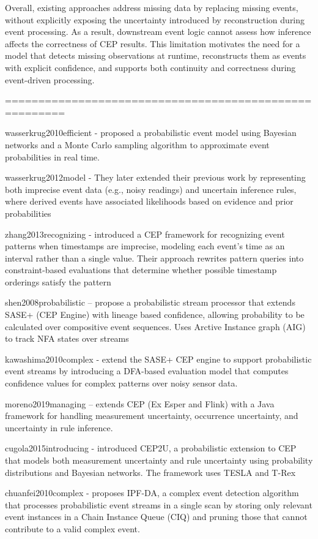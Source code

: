 Overall, existing approaches address missing data by replacing missing events, without explicitly exposing the uncertainty introduced by reconstruction during event processing. As a result, downstream event logic cannot assess how inference affects the correctness of CEP results. This limitation motivates the need for a model that detects missing observations at runtime, reconstructs them as events with explicit confidence, and supports both continuity and correctness during event-driven processing.


=======================================================

wasserkrug2010efficient - proposed a probabilistic event model using Bayesian networks and a Monte Carlo sampling algorithm to approximate event probabilities in real time.

wasserkrug2012model - They later extended their previous work by representing both imprecise event data (e.g., noisy readings) and uncertain inference rules, where derived events have associated likelihoods based on evidence and prior probabilities

zhang2013recognizing - introduced a CEP framework for recognizing event patterns when timestamps are imprecise, modeling each event’s time as an interval rather than a single value. Their approach rewrites pattern queries into constraint-based evaluations that determine whether possible timestamp orderings satisfy the pattern

shen2008probabilistic – propose a probabilistic stream processor that extends SASE+ (CEP Engine) with lineage based confidence, allowing probability to be calculated over compositive event sequences. Uses Arctive Instance graph (AIG) to track NFA states over streams

kawashima2010complex - extend the SASE+ CEP engine to support probabilistic event streams by introducing a DFA-based evaluation model that computes confidence values for complex patterns over noisy sensor data.

moreno2019managing – extends CEP (Ex Esper and Flink) with a Java framework for handling measurement uncertainty, occurrence uncertainty, and uncertainty in rule inference.

cugola2015introducing - introduced CEP2U, a probabilistic extension to CEP that models both measurement uncertainty and rule uncertainty using probability distributions and Bayesian networks. The framework uses TESLA and T-Rex

chuanfei2010complex - proposes IPF-DA, a complex event detection algorithm that processes probabilistic event streams in a single scan by storing only relevant event instances in a Chain Instance Queue (CIQ) and pruning those that cannot contribute to a valid complex event.

